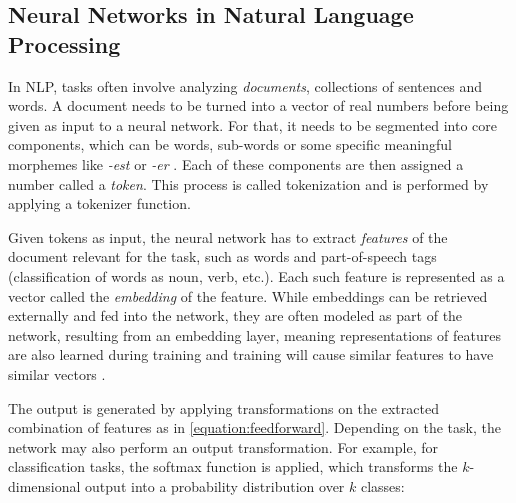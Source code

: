 

\subsection{Neural Networks in Natural Language Processing}
In \ac{NLP}, tasks often involve analyzing \textit{documents}, 
collections of sentences and words. A document needs to be 
turned into a vector of real numbers before being given as input to a neural network. 
For that, it needs to be segmented into core components, which can 
be words, sub-words or some specific meaningful morphemes like 
\textit{-est} or \textit{-er} \parencite[Chapter 2]{jurafsky}. Each of these components are then 
assigned a number called a \textit{token}. This process is called 
tokenization and is performed by applying a tokenizer function.

Given tokens as input, the neural network has to extract
\textit{features} of the document relevant for the task, such as words 
and part-of-speech tags (classification of words as noun, verb, etc.).
Each such feature is represented as a vector called the 
\textit{embedding} of the feature. While embeddings can be 
retrieved externally and fed
into the network, they are often
modeled as part of the network, resulting from an 
embedding layer, meaning representations
of features are also learned during training and 
training will cause similar features to have similar vectors \parencite{goldberg2016primer}.

The output is generated by applying transformations on the 
extracted combination of features as in \autoref{equation:feedforward}.
Depending on the task, the network may also
perform an output transformation. For example, for classification
tasks, the softmax function is applied, which transforms the 
\(k\)-dimensional output
into a probability distribution over \(k\) classes:

